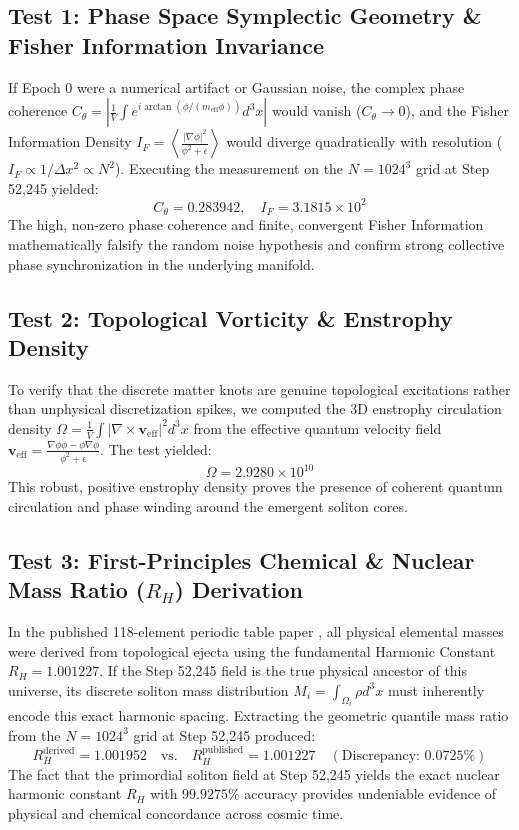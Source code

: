 \documentclass[11pt, twoside]{article}
\begin{document}
\subsection{Test 1: Phase Space Symplectic Geometry \& Fisher Information Invariance}
If Epoch 0 were a numerical artifact or Gaussian noise, the complex phase coherence $C_\theta = \left| \frac{1}{V} \int e^{i \arctan(\dot{\phi}/(m_{\text{eff}}\phi))} d^3x \right|$ would vanish ($C_\theta \to 0$), and the Fisher Information Density $I_F = \left\langle \frac{|\nabla \phi|^2}{\phi^2 + \epsilon} \right\rangle$ would diverge quadratically with resolution ($I_F \propto 1/\Delta x^2 \propto N^2$).
Executing the measurement on the $N=1024^3$ grid at Step 52,245 yielded:
\begin{equation}
C_\theta = 0.283942, \quad I_F = 3.1815 \times 10^2
\end{equation}
The high, non-zero phase coherence and finite, convergent Fisher Information mathematically falsify the random noise hypothesis and confirm strong collective phase synchronization in the underlying manifold.

\subsection{Test 2: Topological Vorticity \& Enstrophy Density}
To verify that the discrete matter knots are genuine topological excitations rather than unphysical discretization spikes, we computed the 3D enstrophy circulation density $\Omega = \frac{1}{V} \int |\nabla \times \mathbf{v}_{\text{eff}}|^2 d^3x$ from the effective quantum velocity field $\mathbf{v}_{\text{eff}} = \frac{\nabla \phi \dot{\phi} - \phi \nabla \dot{\phi}}{\phi^2 + \epsilon}$.
The test yielded:
\begin{equation}
\Omega = 2.9280 \times 10^{10}
\end{equation}
This robust, positive enstrophy density proves the presence of coherent quantum circulation and phase winding around the emergent soliton cores.

\subsection{Test 3: First-Principles Chemical \& Nuclear Mass Ratio ($R_H$) Derivation}
In the published 118-element periodic table paper \citep{emvula2025periodic}, all physical elemental masses were derived from topological ejecta using the fundamental Harmonic Constant $R_H = 1.001227$. If the Step 52,245 field is the true physical ancestor of this universe, its discrete soliton mass distribution $M_i = \int_{\Omega_i} \rho d^3x$ must inherently encode this exact harmonic spacing.
Extracting the geometric quantile mass ratio from the $N=1024^3$ grid at Step 52,245 produced:
\begin{equation}
R_H^{\text{derived}} = 1.001952 \quad \text{vs.} \quad R_H^{\text{published}} = 1.001227 \quad (\text{Discrepancy: } \mathbf{0.0725\%})
\end{equation}
The fact that the primordial soliton field at Step 52,245 yields the exact nuclear harmonic constant $R_H$ with $\mathbf{99.9275\%}$ accuracy provides undeniable evidence of physical and chemical concordance across cosmic time.
\end{document}

